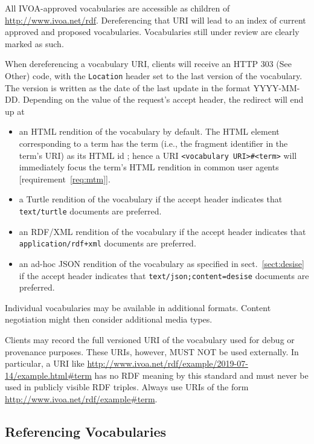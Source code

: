 \documentclass[11pt,a4paper]{ivoa}
\begin{document}
All IVOA-approved vocabularies are accessible as children of
\url{http://www.ivoa.net/rdf}.  Dereferencing that URI will lead to an
index of current approved and proposed vocabularies.
Vocabularies still under review are clearly marked as such.

When dereferencing a vocabulary URI, clients will receive an HTTP 303
(See Other) code, with the \texttt{Location} header set to the last
version of the vocabulary.  The version is written as the date of the
last update in the format YYYY-MM-DD.  Depending on the value of the
request's accept header, the redirect will end up at

\begin{itemize}
\item an HTML rendition of the vocabulary by default.  The HTML element
corresponding to a term has the term (i.e., the fragment identifier in the
term's URI) as its HTML id ; hence a URI
\verb|<vocabulary URI>#<term>| will immediately focus the term's HTML
rendition in common
user agents [requirement~\ref{req:mtm}].

\item a Turtle rendition of the vocabulary if the accept header
indicates that \verb|text/turtle| documents are preferred.

\item an RDF/XML rendition of the vocabulary
if the accept header indicates that
\verb|application/rdf+xml| documents are preferred. 

\item an ad-hoc JSON rendition of the vocabulary as specified in
sect.~\ref{sect:desise} if the accept header indicates that
\verb|text/json;content=desise| documents are preferred.
\end{itemize}

Individual vocabularies may be available in additional formats.
Content negotiation might then consider additional media types.

Clients may record the full versioned URI of the vocabulary used for
debug or provenance purposes.  These URIs, however, MUST NOT be used
externally.  In particular, a URI like
\url{http://www.ivoa.net/rdf/example/2019-07-14/example.html#term} has no
RDF meaning by this standard and must never be used in publicly visible
RDF triples.  Always use URIs of the form
\url{http://www.ivoa.net/rdf/example#term}.

\subsection{Referencing Vocabularies}
\end{document}
